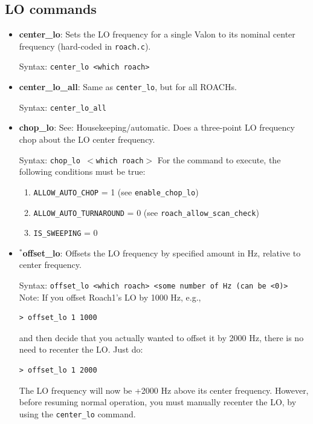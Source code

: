 \subsection{LO commands}

\begin{itemize}[leftmargin=*,label={}]

\item \textbf{center\_lo}: Sets the LO frequency for a single Valon to its nominal center frequency (hard-coded in \texttt{roach.c}).

Syntax: \texttt{center\_lo <which roach>}

\item \textbf{center\_lo\_all}: Same as \texttt{center\_lo}, but for all ROACHs.

Syntax: \texttt{center\_lo\_all}

\item \textbf{chop\_lo}: See: Housekeeping/automatic. Does a three-point LO frequency chop about the LO center frequency.

Syntax: \texttt{chop\_lo $<$which roach$>$}
For the command to execute, the following conditions must be true:

\begin{enumerate}
\item \texttt{ALLOW\_AUTO\_CHOP} = 1 (see \texttt{enable\_chop\_lo})
\item \texttt{ALLOW\_AUTO\_TURNAROUND} = 0 (see \texttt{roach\_allow\_scan\_check})
\item \texttt{IS\_SWEEPING} = 0
\end{enumerate}

\item$^{*}$\textbf{offset\_lo}: Offsets the LO frequency by specified amount in Hz, relative to center frequency.\

Syntax: \texttt{offset\_lo <which roach> <some number of Hz (can be <0)>}\\
Note: If you offset Roach1’s LO by 1000 Hz, e.g.,
\begin{verbatim}
> offset_lo 1 1000
\end{verbatim}
and then decide that you actually wanted to offset it by 2000 Hz, there is no need to recenter the LO\@. Just do:
\begin{verbatim}
> offset_lo 1 2000
\end{verbatim}
The LO frequency will now be +2000 Hz above its center frequency. However, before resuming normal operation, you must manually recenter the LO, by using the \texttt{center\_lo} command.


\end{itemize}
